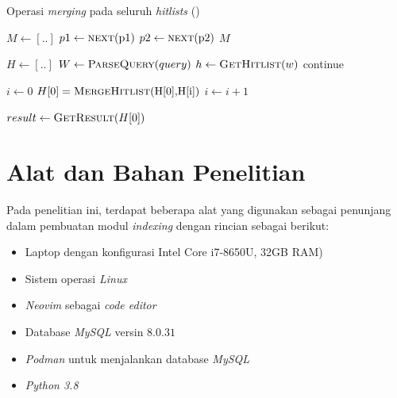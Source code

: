 \begin{algorithm}[H]
  \label{alg:merge}
  \caption{Operasi \textit{merging} pada seluruh \textit{hitlists} (\cite{brin1998google})}
  \begin{algorithmic}
    \State $M \gets [..]$
       
         
          \State {}
        \EndIf
      \EndIf
      \State $p1 \gets \Call{next}{$p1$}$
      \State $p2 \gets \Call{next}{$p2$}$
    \EndWhile{}
    \State \Return $M$
    \EndFunction

    \item[] %

    \State $H \gets [..]$
    \State $W \gets \Call{ParseQuery}{query}$ 
      \State $h \gets \Call{GetHitlist}{w}$
        \State continue
      \EndIf
      \State {}
    \EndFor

    \item[] %

    \State $i \gets 0$
      \State $H[0] = \Call{MergeHitlist}{$H[0]$, $H[i]$}$
      \State $i \gets i + 1$
    \EndWhile

    \item[] %

    \State $result \gets \Call{GetResult}{H[0]}$
  \end{algorithmic}
\end{algorithm}

\section{Alat dan Bahan Penelitian}

Pada penelitian ini, terdapat beberapa alat yang digunakan sebagai penunjang
dalam pembuatan modul \textit{indexing} dengan rincian sebagai berikut:

\begin{itemize}
  \item{Laptop dengan konfigurasi Intel Core i7-8650U, 32GB RAM)}
  \item{Sistem operasi \textit{Linux}}
  \item{\textit{Neovim} sebagai \textit{code editor}}
  \item{Database \textit{MySQL} versin $8.0.31$}
  \item{\textit{Podman} untuk menjalankan database \textit{MySQL}}
  \item{\textit{Python 3.8}}
\end{itemize}


